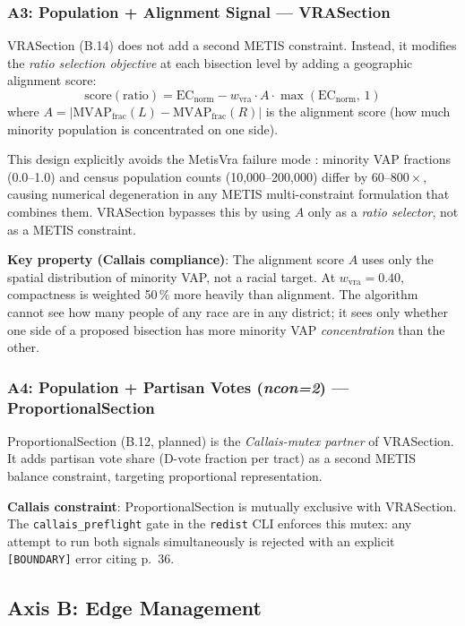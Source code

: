 \subsubsection*{A3: Population + Alignment Signal --- VRASection}

VRASection (B.14) does not add a second METIS constraint.
Instead, it modifies the \emph{ratio selection objective} at each bisection level
by adding a geographic alignment score:
\[
  \text{score}(\text{ratio}) = \mathrm{EC}_\text{norm} - w_\text{vra}
  \cdot A \cdot \max(\mathrm{EC}_\text{norm},\, 1)
\]
where $A = |\text{MVAP}_\text{frac}(L) - \text{MVAP}_\text{frac}(R)|$
is the alignment score (how much minority population is concentrated on one side).

This design explicitly avoids the MetisVra failure mode \citep{b3paper}:
minority VAP fractions (0.0--1.0) and census population counts (10,000--200,000)
differ by $60$--$800\times$, causing numerical degeneration in any METIS
multi-constraint formulation that combines them.
VRASection bypasses this by using $A$ only as a \emph{ratio selector}, not as
a METIS constraint.

\textbf{Key property (Callais compliance)}: The alignment score $A$ uses only
the spatial distribution of minority VAP, not a racial target.
At $w_\text{vra} = 0.40$, compactness is weighted 50\,\% more heavily than
alignment.
The algorithm cannot see how many people of any race are in any district;
it sees only whether one side of a proposed bisection has more minority VAP
\emph{concentration} than the other.

\subsubsection*{A4: Population + Partisan Votes (\textit{ncon=2}) --- ProportionalSection}

ProportionalSection (B.12, planned) is the \emph{Callais-mutex partner} of
VRASection.
It adds partisan vote share (D-vote fraction per tract) as a second METIS balance
constraint, targeting proportional representation.

\textbf{Callais constraint}: ProportionalSection is mutually exclusive with
VRASection.
The \texttt{callais\_preflight} gate in the \texttt{redist} CLI enforces
this mutex: any attempt to run both signals simultaneously is rejected with
an explicit \texttt{[BOUNDARY]} error citing \callais{} p.~36.

\subsection{Axis B: Edge Management}


